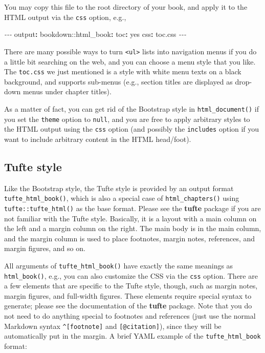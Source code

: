 \documentclass[
  12pt,
]{krantz}
\newenvironment{Shaded}{\begin{snugshade}}{\end{snugshade}}
\newcommand{\AttributeTok}[1]{\textcolor[rgb]{0.77,0.63,0.00}{#1}}
\newcommand{\CharTok}[1]{\textcolor[rgb]{0.31,0.60,0.02}{#1}}
\newcommand{\FunctionTok}[1]{\textcolor[rgb]{0.00,0.00,0.00}{#1}}
\newcommand{\KeywordTok}[1]{\textcolor[rgb]{0.13,0.29,0.53}{\textbf{#1}}}
\newcommand{\PreprocessorTok}[1]{\textcolor[rgb]{0.56,0.35,0.01}{\textit{#1}}}
\theoremstyle{definition}
\theoremstyle{definition}
\theoremstyle{definition}
\theoremstyle{definition}
\theoremstyle{remark}
\begin{document}
You may copy this file to the root directory of your book, and apply it to the HTML output via the \texttt{css} option, e.g.,

\begin{Shaded}
\begin{Highlighting}[]
\PreprocessorTok{{-}{-}{-}}
\FunctionTok{output}\KeywordTok{:}
\AttributeTok{  bookdown:}\FunctionTok{:html\_book}\KeywordTok{:}
\AttributeTok{    }\FunctionTok{toc}\KeywordTok{:}\AttributeTok{ }\CharTok{yes}
\AttributeTok{    }\FunctionTok{css}\KeywordTok{:}\AttributeTok{ toc.css}
\PreprocessorTok{{-}{-}{-}}
\end{Highlighting}
\end{Shaded}

There are many possible ways to turn \texttt{\textless{}ul\textgreater{}} lists into navigation menus if you do a little bit searching on the web, and you can choose a menu style that you like. The \texttt{toc.css} we just mentioned is a style with white menu texts on a black background, and supports sub-menus (e.g., section titles are displayed as drop-down menus under chapter titles).

As a matter of fact, you can get rid of the Bootstrap style in \texttt{html\_document()} if you set the \texttt{theme} option to \texttt{null}, and you are free to apply arbitrary styles to the HTML output using the \texttt{css} option (and possibly the \texttt{includes} option if you want to include arbitrary content in the HTML head/foot).

\hypertarget{tufte-style}{%
\subsection{Tufte style}\label{tufte-style}}

Like the Bootstrap style, the Tufte style is provided by an output format \texttt{tufte\_html\_book()}, which is also a special case of \texttt{html\_chapters()} using \texttt{tufte::tufte\_html()} as the base format. Please see the \textbf{tufte} package \citep{R-tufte} if you are not familiar with the Tufte style. Basically, it is a layout with a main column on the left and a margin column on the right. The main body is in the main column, and the margin column is used to place footnotes, margin notes, references, and margin figures, and so on.

All arguments of \texttt{tufte\_html\_book()} have exactly the same meanings as \texttt{html\_book()}, e.g., you can also customize the CSS via the \texttt{css} option. There are a few elements that are specific to the Tufte style, though, such as margin notes, margin figures, and full-width figures. These elements require special syntax to generate; please see the documentation of the \textbf{tufte} package. Note that you do not need to do anything special to footnotes and references (just use the normal Markdown syntax \texttt{\^{}{[}footnote{]}} and \texttt{{[}@citation{]}}), since they will be automatically put in the margin. A brief YAML example of the \texttt{tufte\_html\_book} format:
\end{document}
